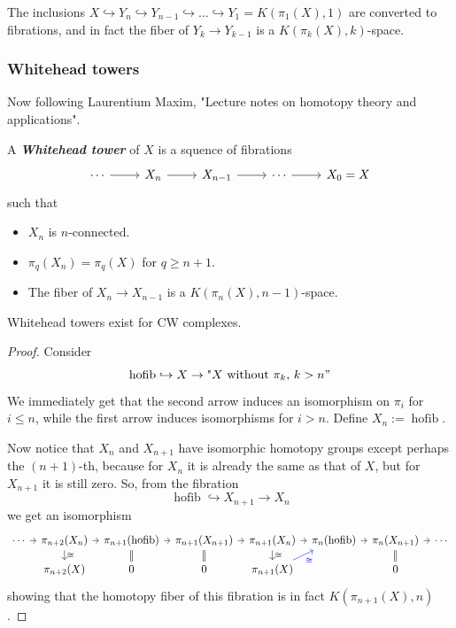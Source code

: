 The inclusions $X\hookrightarrow Y_{n}\hookrightarrow Y_{n-1}\hookrightarrow \ldots\hookrightarrow Y_{1}=K(\pi_{1}(X),1)$ are converted to fibrations, and in fact the fiber of $Y_{k}\to Y_{k-1}$ is a $K(\pi_{k}(X),k)$-space.

\subsubsection*{Whitehead towers}

Now following Laurentium Maxim, "Lecture notes on homotopy theory and applications".

\begin{defn}
	A \textit{\textbf{Whitehead tower}} of $X$ is a squence of fibrations
	\[\begin{tikzcd}
		\cdots \arrow[r]&X_{n}\arrow[r]&X_{n-1}\arrow[r]&\cdots \arrow[r]&X_{0}=X
	\end{tikzcd}\]
	such that
	\begin{itemize}
		\item $X_n$ is $n$-connected.
		\item $\pi_{q}(X_{n})=\pi_{q}(X)$ for $q\geq n+1$.
		\item The fiber of $X_n\to  X_{n-1}$ is a $K(\pi_{n}(X),n-1)$-space.
	\end{itemize}
\end{defn}
\begin{lemma}
	Whitehead towers exist for CW complexes.
\end{lemma}
\begin{proof}
	Consider
	\[\operatorname{hofib}\hookrightarrow X\to \text{"$X$ without $\pi_{k}$, $k>n$}"\]
	We immediately get that the second arrow induces an isomorphism on $\pi_{i}$ for $i\leq n$, while the first arrow induces isomorphisms for $i>n$. Define $ X_{n}:=\operatorname{hofib}$.

	Now notice that $X_n$ and $X_{n+1}$ have isomorphic homotopy groups except perhaps the $(n+1)$-th, because for $X_{n}$ it is already the same as that of $X$, but for $X_{n+1}$ it is still zero. So, from the fibration
	\[\operatorname{hofib} \hookrightarrow X_{n+1}\to X_{n}\]
	we get an isomorphism
	\[\begin{tikzcd}[column sep=tiny,row sep=small]
		\cdots\arrow[r]&\pi_{n+2}(X_{n})\arrow[r]\arrow[d,"\cong "]&\pi_{n+1}(\operatorname{hofib} )\arrow[d,equals]\arrow[r]&\pi_{n+1}(X_{n+1})\arrow[r]\arrow[d,equals]&\pi_{n+1}(X_{n})\arrow[r]\arrow[d,"\cong "]&\pi_{n}(\operatorname{hofib} )\arrow[r]&\pi_{n}(X_{n+1})\arrow[r]\arrow[d,equals]&\cdots\\
			       &\pi_{n+2}(X)&0&0&\pi_{n+1}(X)\arrow[ur,blue,"{\color{blue}\cong }",swap]&&0&
		\end{tikzcd}\]
	showing that the homotopy fiber of this fibration is in fact $K(\pi_{n+1}(X),n)$.
	
\end{proof}

